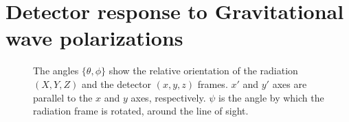 % 



\section{Detector response to Gravitational wave polarizations}\label{sec:ligo_response}
\begin{figure}
 \begin{center}
 \end{center}
\caption{\label{fig:radiation_detector_frames}
The angles $\{\theta,\phi\}$ show the relative orientation of the radiation 
$(X,Y,Z)$ and the detector $(x,y,z)$ frames. $x'$ and $y'$ axes are parallel 
to the $x$ and $y$ axes, respectively. $\psi$ is the angle by which the radiation
frame is rotated, around the line of sight.}
\end{figure}


